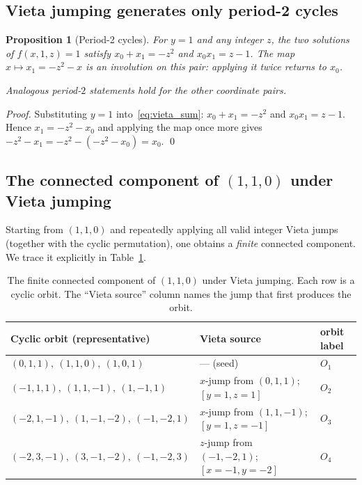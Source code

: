 \documentclass[12pt,a4paper]{article}
\newtheorem{proposition}[theorem]{Proposition}
\theoremstyle{definition}
\begin{document}
\subsection{Vieta jumping generates only period-2 cycles}

\begin{proposition}[Period-2 cycles]\label{prop:period2}
  For $y = 1$ and any integer $z$, the two solutions of
  $f(x,1,z) = 1$ satisfy $x_0 + x_1 = -z^2$ and $x_0 x_1 = z - 1$.
  The map $x \mapsto x_1 = -z^2 - x$ is an involution on this pair:
  applying it twice returns to $x_0$.

  Analogous period-$2$ statements hold for the other coordinate pairs.
\end{proposition}

\begin{proof}
  Substituting $y=1$ into~\eqref{eq:vieta_sum}: $x_0+x_1=-z^2$ and
  $x_0 x_1 = z-1$.  Hence $x_1 = -z^2-x_0$ and applying the map once
  more gives $-z^2 - x_1 = -z^2 - (-z^2-x_0) = x_0$. \qed
\end{proof}

\subsection{The connected component of $(1,1,0)$ under Vieta jumping}

Starting from $(1,1,0)$ and repeatedly applying all valid integer
Vieta jumps (together with the cyclic permutation), one obtains a
\emph{finite} connected component.  We trace it explicitly in
Table~\ref{tab:component}.

\begin{table}[h]
\centering
\caption{The finite connected component of $(1,1,0)$ under Vieta jumping.
  Each row is a cyclic orbit.  The ``Vieta source'' column names the
  jump that first produces the orbit.}
\label{tab:component}
\begin{tabular}{lll}
\toprule
Cyclic orbit (representative) & Vieta source & orbit label \\
\midrule
$(0,1,1),\ (1,1,0),\ (1,0,1)$ & — (seed) & $O_1$ \\
$(-1,1,1),\ (1,1,-1),\ (1,-1,1)$ & $x$-jump from $(0,1,1)$; $[y=1,z=1]$ & $O_2$ \\
$(-2,1,-1),\ (1,-1,-2),\ (-1,-2,1)$ & $x$-jump from $(1,1,-1)$; $[y=1,z=-1]$ & $O_3$ \\
$(-2,3,-1),\ (3,-1,-2),\ (-1,-2,3)$ & $z$-jump from $(-1,-2,1)$; $[x=-1,y=-2]$ & $O_4$ \\
\bottomrule
\end{tabular}
\end{table}
\end{document}
